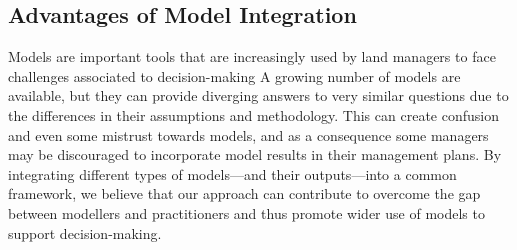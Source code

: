 \subsection*{Advantages of Model Integration}
Models are important tools that are increasingly used by land managers to face challenges associated to decision-making \citep{Guisan2013}
A growing number of models are available, but they can provide diverging answers to very similar questions due to the differences in their assumptions and methodology. 
This can create confusion and even some mistrust towards models, and as a consequence some managers may be discouraged to incorporate model results in their management plans. 
By integrating different types of models---and their outputs---into a common framework, we believe that our approach can contribute to overcome the gap between modellers and practitioners and thus promote wider use of models to support decision-making.

